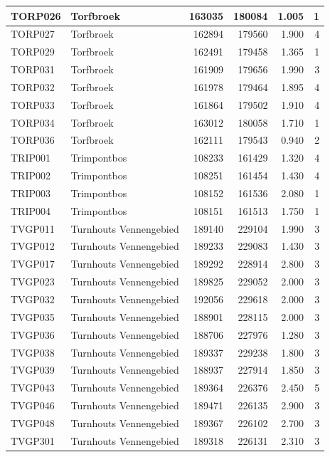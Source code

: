 \documentclass[11pt,]{book}
\begin{document}
\begin{table}
\begin{tabular}[t]{l|l|r|r|r|r}
\hline
TORP026 & Torfbroek & 163035 & 180084 & 1.005 & 1\\
\hline
TORP027 & Torfbroek & 162894 & 179560 & 1.900 & 4\\
\hline
TORP029 & Torfbroek & 162491 & 179458 & 1.365 & 1\\
\hline
TORP031 & Torfbroek & 161909 & 179656 & 1.990 & 3\\
\hline
TORP032 & Torfbroek & 161978 & 179464 & 1.895 & 4\\
\hline
TORP033 & Torfbroek & 161864 & 179502 & 1.910 & 4\\
\hline
TORP034 & Torfbroek & 163012 & 180058 & 1.710 & 1\\
\hline
TORP036 & Torfbroek & 162111 & 179543 & 0.940 & 2\\
\hline
TRIP001 & Trimpontbos & 108233 & 161429 & 1.320 & 4\\
\hline
TRIP002 & Trimpontbos & 108251 & 161454 & 1.430 & 4\\
\hline
TRIP003 & Trimpontbos & 108152 & 161536 & 2.080 & 1\\
\hline
TRIP004 & Trimpontbos & 108151 & 161513 & 1.750 & 1\\
\hline
TVGP011 & Turnhouts Vennengebied & 189140 & 229104 & 1.990 & 3\\
\hline
TVGP012 & Turnhouts Vennengebied & 189233 & 229083 & 1.430 & 3\\
\hline
TVGP017 & Turnhouts Vennengebied & 189292 & 228914 & 2.800 & 3\\
\hline
TVGP023 & Turnhouts Vennengebied & 189825 & 229052 & 2.000 & 3\\
\hline
TVGP032 & Turnhouts Vennengebied & 192056 & 229618 & 2.000 & 3\\
\hline
TVGP035 & Turnhouts Vennengebied & 188901 & 228115 & 2.000 & 3\\
\hline
TVGP036 & Turnhouts Vennengebied & 188706 & 227976 & 1.280 & 3\\
\hline
TVGP038 & Turnhouts Vennengebied & 189337 & 229238 & 1.800 & 3\\
\hline
TVGP039 & Turnhouts Vennengebied & 188937 & 227914 & 1.850 & 3\\
\hline
TVGP043 & Turnhouts Vennengebied & 189364 & 226376 & 2.450 & 5\\
\hline
TVGP046 & Turnhouts Vennengebied & 189471 & 226135 & 2.900 & 3\\
\hline
TVGP048 & Turnhouts Vennengebied & 189367 & 226102 & 2.700 & 3\\
\hline
TVGP301 & Turnhouts Vennengebied & 189318 & 226131 & 2.310 & 3\\

\end{tabular}
\end{table}
\end{document}
